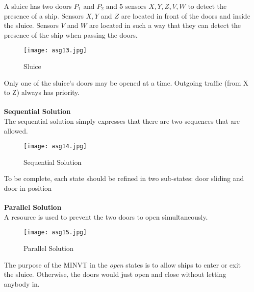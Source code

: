 \documentclass[../main.tex]{subfiles}
\begin{document}
\begin{exmp}
A sluice has two doors $P_1$ and $P_2$ and 5 sensors $X,Y,Z,V,W$ to detect the presence of a ship. Sensors  $X, Y$ and $Z$ are located in front of the doors and inside the sluice. Sensors $V$ and $W$ are located in such a way that they can detect the presence of the ship when passing the doors. 

\begin{figure}[H]
    \centering
    \texttt{[image: asg13.jpg]}
    \caption{Sluice}
    \label{asg13}
\end{figure}
Only one of the sluice's doors may be opened at a time. Outgoing traffic (from X to Z) always has priority.
\\\\
\textbf{Sequential Solution}\\
The sequential solution simply expresses that there are two sequences that are allowed.
\begin{figure}[H]
    \centering
    \texttt{[image: asg14.jpg]}
    \caption{Sequential Solution}
    \label{asg14}
\end{figure}
To be complete, each state should be refined in two sub-states: door sliding and door in position
\\\\
\textbf{Parallel Solution} \\
A resource is used to prevent the two doors to open simultaneously.
\begin{figure}[H]
    \centering
    \texttt{[image: asg15.jpg]}
    \caption{Parallel Solution}
    \label{asg15}
\end{figure}
The purpose of the MINVT in the \textit{open} states is to allow ships to enter or exit the sluice. Otherwise, the doors would just open and close without letting anybody in. 
\end{exmp}
\end{document}
